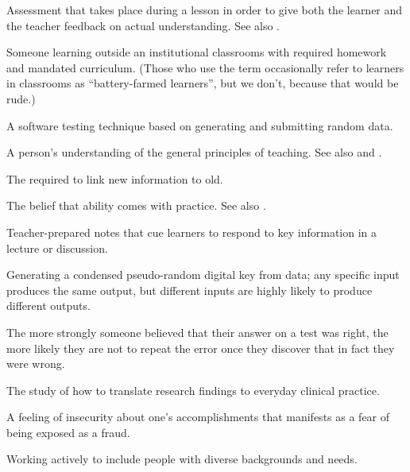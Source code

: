 \begin{description}
 Assessment that takes
place during a lesson in order to give both the learner and the teacher
feedback on actual understanding. See
also .

 Someone learning outside an
institutional classrooms with required homework and mandated curriculum. (Those
who use the term occasionally refer to learners in classrooms as
``battery-farmed learners'', but we don't, because that would be rude.)

 A software testing technique based on
generating and submitting random data.

 A
person's understanding of the general principles of teaching. See also
and .

 The 
required to link new information to old.

 The belief that ability comes with
practice. See also .

 Teacher-prepared notes that cue
learners to respond to key information in a lecture or discussion.

 Generating a condensed pseudo-random digital key
from data; any specific input produces the same output, but different inputs are
highly likely to produce different outputs.

 The more strongly someone
believed that their answer on a test was right, the more likely they are not to
repeat the error once they discover that in fact they were wrong.

 The study of how to
translate research findings to everyday clinical practice.

 A feeling of insecurity about
one's accomplishments that manifests as a fear of being exposed as a fraud.

 Working actively to include people with
diverse backgrounds and needs.


\end{description}
